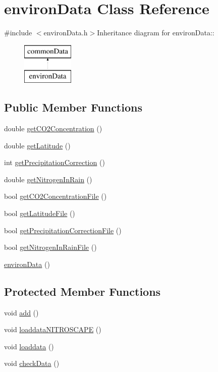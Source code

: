 \hypertarget{classenviron_data}{
\section{environData Class Reference}
\label{classenviron_data}
}


{\ttfamily \#include $<$environData.h$>$}Inheritance diagram for environData::\begin{figure}[H]
\begin{center}
\leavevmode
\includegraphics[height=2cm]{classenviron_data}
\end{center}
\end{figure}
\subsection*{Public Member Functions}
\begin{DoxyCompactItemize}
\item 
double \hyperlink{classenviron_data_a514d2fee4098d8d6649d5002b1fc4a09}{getCO2Concentration} ()
\item 
double \hyperlink{classenviron_data_aee903059b82748984269a925496f8632}{getLatitude} ()
\item 
int \hyperlink{classenviron_data_a3a231cea960c58e7226c3b402d9df068}{getPrecipitationCorrection} ()
\item 
double \hyperlink{classenviron_data_a9972afb75d974b12a02d4bb4f0b0218e}{getNitrogenInRain} ()
\item 
bool \hyperlink{classenviron_data_a2fda4cce089fa81c1225e2e12f51db74}{getCO2ConcentrationFile} ()
\item 
bool \hyperlink{classenviron_data_aa48a694626c9767dc41d9a7f88842e8d}{getLatitudeFile} ()
\item 
bool \hyperlink{classenviron_data_aa5a9100f55b861816ed776ded2d5437b}{getPrecipitationCorrectionFile} ()
\item 
bool \hyperlink{classenviron_data_a7ab7cadb2260403a37d39ae8187fc1b5}{getNitrogenInRainFile} ()
\item 
\hyperlink{classenviron_data_a301bd573b37f5ef97e3820431a953c5a}{environData} ()
\end{DoxyCompactItemize}
\subsection*{Protected Member Functions}
\begin{DoxyCompactItemize}
\item 
void \hyperlink{classenviron_data_abcedca793f5ec608308cc9594d85cf29}{add} ()
\item 
void \hyperlink{classenviron_data_af231f5b82b1a3729fee9454e61428add}{loaddataNITROSCAPE} ()
\item 
void \hyperlink{classenviron_data_accf688cfe23b5c3491bbdcf7231c722d}{loaddata} ()
\item 
void \hyperlink{classenviron_data_a0c00314bcd9f27d8bfb01546dea811ca}{checkData} ()
\end{DoxyCompactItemize}
